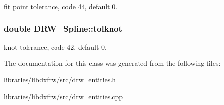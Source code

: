 fit point tolerance, code 44, default 0. \hypertarget{classDRW__Spline_a62139497f4127ed0d909cbe6cb7d5304}{
\subsubsection[{tolknot}]{\setlength{\rightskip}{0pt plus 5cm}double D\-R\-W\-\_\-\-Spline\-::tolknot}}\label{classDRW__Spline_a62139497f4127ed0d909cbe6cb7d5304}
knot tolerance, code 42, default 0. 

The documentation for this class was generated from the following files\-:\begin{DoxyCompactItemize}
\item 
libraries/libdxfrw/src/drw\-\_\-entities.\-h\item 
libraries/libdxfrw/src/drw\-\_\-entities.\-cpp\end{DoxyCompactItemize}
